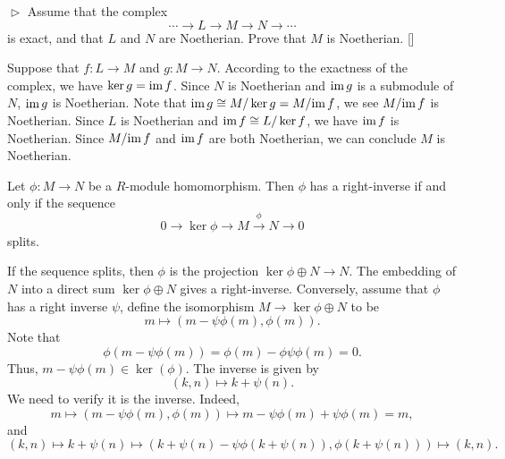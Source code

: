 \documentclass[12pt,letterpaper,boxed]{hmcpset}
\newcommand{\im}{\mathrm{im}\hspace{1.5pt}}
\begin{document}
\begin{problem}[7.5]
$\vartriangleright$ Assume that the complex
\[
\cdots \longrightarrow L \longrightarrow M\longrightarrow N \rightarrow\cdots
\]
is exact, and that $L$ and $N$ are Noetherian. Prove that $M$ is Noetherian. []
\end{problem}
\begin{solution}
Suppose that $f:L\to M$ and $g:M\to N$. According to the exactness of the complex, we have $\ker g=\im f$. Since $N$ is Noetherian and $\im g$ is a submodule of $N$, $\im g$ is Noetherian. Note that $\im g\cong M/\ker g=M/\im f$, we see $M/\im f$ is Noetherian. Since $L$ is Noetherian and $\im f\cong L/\ker f$, we have $\im f$ is Noetherian. Since $M/\im f$ and $\im f$ are both Noetherian, we can conclude $M$ is Noetherian.
\end{solution}

\begin{problem}[7.6]
    Let $\phi:M\to N$ be a $R$-module homomorphism. Then $\phi$ has a right-inverse if and only if the sequence
    \[
0\to \ker \phi\to M\stackrel{\phi}\to N \to 0
    \]
    splits.
\end{problem}
\begin{solution}
    If the sequence splits, then $\phi$ is the projection $\ker\phi\oplus N\to N$. The embedding of $N$ into a direct sum $\ker\phi\oplus N$ gives a right-inverse. Conversely, assume that $\phi$ has a right inverse $\psi$, define the isomorphism $M\to \ker\phi\oplus N$ to be 
    \[
m\mapsto (m-\psi \phi(m), \phi(m)).
    \]
    Note that 
    \[
\phi(m-\psi\phi(m)) = \phi(m)-\phi\psi\phi(m)=0.
    \]
    Thus, $m-\psi\phi(m)\in \ker(\phi)$.   The inverse is given by
    \[
    (k, n)\mapsto k+\psi(n).
    \]
    We need to verify it is the inverse. Indeed,
    \[
    m\mapsto (m-\psi \phi(m), \phi(m))\mapsto m- \psi \phi(m)+\psi\phi(m)=m,
    \]
    and 
    \[
        (k, n)\mapsto k+\psi(n)\mapsto (k+\psi(n)-\psi\phi(k+\psi(n)), \phi(k+\psi(n)))\mapsto(k,n).
    \]
\end{solution}
\end{document}
